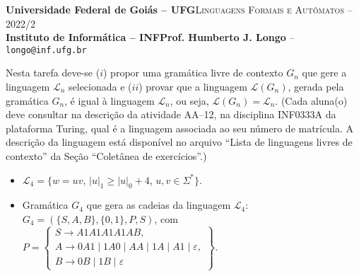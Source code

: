 \documentclass[12pt]{article}
\def\discente{Iury Alexandre Alves Bo}
\def\matricula{202103735}
\def\ua{12}
\def\myling{{4}} %
\begin{document}
 \begin{tcolorbox}[rounded corners, colback=blue!3, colframe=blue!40!black]
  \footnotesize\textbf{Universidade Federal de Goiás -- UFG}\hfill \textsc{Linguagens Formais e Autômatos -- 2022/2}\\
  \footnotesize\textbf{Instituto de Informática -- INF\hfill Prof. Humberto J. Longo} -- \scriptsize\texttt{longo@inf.ufg.br}
 \end{tcolorbox}\bigskip
%
\begin{tcolorbox}[rounded corners, colback=blue!2, colframe=blue!40!black, title=\textbf{Atividade AA-\ua}]
  Nesta tarefa deve-se ($i$) propor uma gramática livre de contexto $G_n$ que gere a linguagem $\mathcal{L}_n$ selecionada e ($ii$) provar que a linguagem $\mathcal{L}(G_n)$, gerada pela gramática $G_n$, é igual à linguagem $\mathcal{L}_n$, ou seja, $\mathcal{L}(G_n)=\mathcal{L}_n$. (Cada aluna(o) deve consultar na descrição da atividade AA--\ua, na disciplina INF0333A da plataforma Turing, qual é a linguagem associada ao seu número de matrícula. A descrição da linguagem está disponível no arquivo ``Lista de linguagens livres de contexto'' da Seção ``Coletânea de exercícios''.)
\end{tcolorbox}\bigskip

%
\begin{tcolorbox}[rounded corners, colback=yellow!5, colframe=red!40!black, title={\discente\ (\matricula)}]
\begin{itemize}
  \item $\mathcal{L}_{\myling} = \{w = uv$, $|u|_1 \geqslant |u|_0 + 4$, $u,v \in \Sigma ^*\}$.
  \item Gramática $G_{\myling}$ que gera as cadeias da linguagem $\mathcal{L}_{\myling}$:\\ $G_{\myling}=(\{S,A,B\},\{0,1\},P,S)$, com
  $
   P =
   \left\{\begin{array}{l}
    S\to A1A1A1A1AB,\\
    A\to 0A1 \mid 1A0 \mid AA \mid 1A \mid A1 \mid \varepsilon,\\
    B\to 0B \mid 1B \mid \varepsilon
   \end{array}\right\}.
  $
 \end{itemize}
\end{tcolorbox}\bigskip
\end{document}
